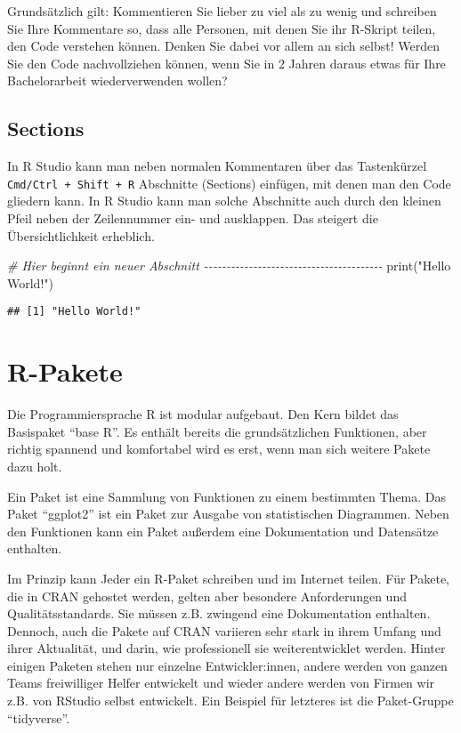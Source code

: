 \documentclass[
]{book}
\newenvironment{Shaded}{\begin{snugshade}}{\end{snugshade}}
\newcommand{\CommentTok}[1]{\textcolor[rgb]{0.56,0.35,0.01}{\textit{#1}}}
\newcommand{\FunctionTok}[1]{\textcolor[rgb]{0.00,0.00,0.00}{#1}}
\newcommand{\NormalTok}[1]{#1}
\newcommand{\StringTok}[1]{\textcolor[rgb]{0.31,0.60,0.02}{#1}}
\begin{document}
Grundsätzlich gilt: Kommentieren Sie lieber zu viel als zu wenig und schreiben Sie Ihre Kommentare so, dass alle Personen, mit denen Sie ihr R-Skript teilen, den Code verstehen können. Denken Sie dabei vor allem an sich selbst! Werden Sie den Code nachvollziehen können, wenn Sie in 2 Jahren daraus etwas für Ihre Bachelorarbeit wiederverwenden wollen?

\hypertarget{sections}{%
\subsection{Sections}\label{sections}}

In R Studio kann man neben normalen Kommentaren über das Tastenkürzel \texttt{Cmd/Ctrl\ +\ Shift\ +\ R} Abschnitte (Sections) einfügen, mit denen man den Code gliedern kann. In R Studio kann man solche Abschnitte auch durch den kleinen Pfeil neben der Zeilennummer ein- und ausklappen. Das steigert die Übersichtlichkeit erheblich.

\begin{Shaded}
\begin{Highlighting}[]
\CommentTok{\# Hier beginnt ein neuer Abschnitt {-}{-}{-}{-}{-}{-}{-}{-}{-}{-}{-}{-}{-}{-}{-}{-}{-}{-}{-}{-}{-}{-}{-}{-}{-}{-}{-}{-}{-}{-}{-}{-}{-}{-}{-}{-}{-}{-}{-}{-}}
\FunctionTok{print}\NormalTok{(}\StringTok{"Hello World!"}\NormalTok{)}
\end{Highlighting}
\end{Shaded}

\begin{verbatim}
## [1] "Hello World!"
\end{verbatim}

\hypertarget{r-pakete}{%
\section{R-Pakete}\label{r-pakete}}

Die Programmiersprache R ist modular aufgebaut. Den Kern bildet das Basispaket ``base R''. Es enthält bereits die grundsätzlichen Funktionen, aber richtig spannend und komfortabel wird es erst, wenn man sich weitere Pakete dazu holt.

Ein Paket ist eine Sammlung von Funktionen zu einem bestimmten Thema. Das Paket ``ggplot2'' ist ein Paket zur Ausgabe von statistischen Diagrammen. Neben den Funktionen kann ein Paket außerdem eine Dokumentation und Datensätze enthalten.

Im Prinzip kann Jeder ein R-Paket schreiben und im Internet teilen. Für Pakete, die in CRAN gehostet werden, gelten aber besondere Anforderungen und Qualitätsstandards. Sie müssen z.B. zwingend eine Dokumentation enthalten. Dennoch, auch die Pakete auf CRAN variieren sehr stark in ihrem Umfang und ihrer Aktualität, und darin, wie professionell sie weiterentwicklet werden. Hinter einigen Paketen stehen nur einzelne Entwickler:innen, andere werden von ganzen Teams freiwilliger Helfer entwickelt und wieder andere werden von Firmen wir z.B. von RStudio selbst entwickelt. Ein Beispiel für letzteres ist die Paket-Gruppe ``tidyverse''.
\end{document}
